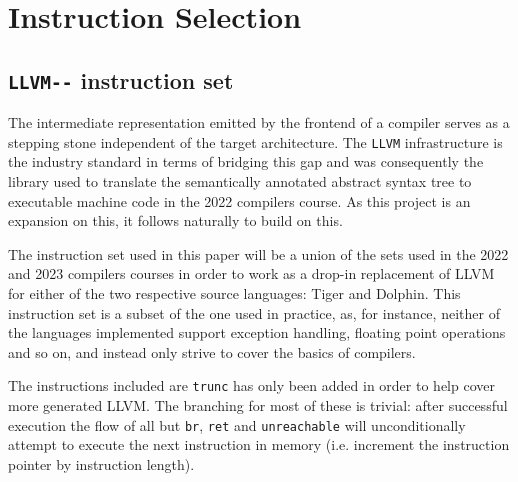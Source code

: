 \documentclass{article}
\begin{document}


\section{Instruction Selection}



\subsection{\lstinline!LLVM--! instruction set}

The intermediate representation emitted by the frontend of a compiler serves as a stepping stone independent of the target architecture. The \lstinline!LLVM! infrastructure is the industry standard in terms of bridging this gap and was consequently the library used to translate the semantically annotated abstract syntax tree to executable machine code in the 2022 compilers course. As this project is an expansion on this, it follows naturally to build on this. 

The instruction set used in this paper will be a union of the sets used in the 2022 and 2023 compilers courses in order to work as a drop-in replacement of LLVM for either of the two respective source languages:  Tiger and Dolphin. This instruction set is a subset of the one used in practice, as, for instance, neither of the languages implemented support exception handling, floating point operations and so on, and instead only strive to cover the basics of compilers.

The instructions included are
\lstinline!trunc! has only been added in order to help cover more generated LLVM.
The branching for most of these is trivial: after successful execution the flow of all but \lstinline!br!, \lstinline!ret! and \lstinline!unreachable! will unconditionally attempt to execute the next instruction in memory (i.e. increment the instruction pointer by instruction length).
\end{document}
